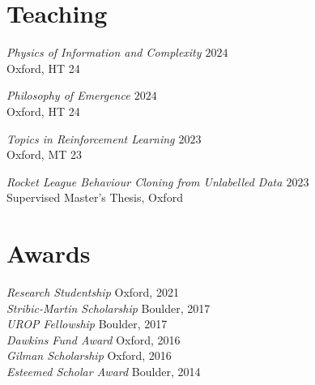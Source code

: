 \documentclass[margin]{res}
\begin{document}
\begin{resume}
                \section{Teaching}
                {\sl Physics of Information and Complexity \hfill $2024$}\\
                Oxford, HT 24

                {\sl Philosophy of Emergence \hfill $2024$}\\
                Oxford, HT 24

                {\sl Topics in Reinforcement Learning \hfill $2023$}\\
                Oxford, MT 23

                {\sl Rocket League Behaviour Cloning from Unlabelled Data \hfill $2023$}\\
                Supervised Master's Thesis, Oxford
                

                \section{Awards}

                {\sl Research Studentship} \hfill Oxford, 2021 \\
                {\sl Stribic-Martin Scholarship} \hfill Boulder, 2017 \\
                        {\sl UROP Fellowship} \hfill Boulder, 2017 \\
                        {\sl Dawkins Fund Award} \hfill Oxford, 2016 \\
                        {\sl Gilman Scholarship} \hfill Oxford, 2016 \\
                        {\sl Esteemed Scholar Award} \hfill Boulder, 2014 \\




\end{resume}
\end{document}
